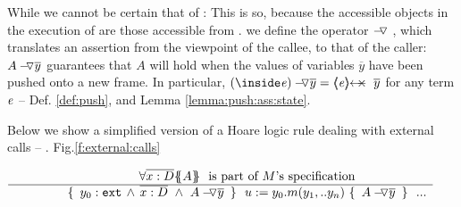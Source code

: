  {While we cannot be certain that   of : 
This is so, because the   accessible objects in the execution of  are those accessible from .
 we define the operator $\pushSymbolAA$ , which   translates an assertion from the viewpoint of the callee, to that of the caller:
 $\PushAS y A$   guarantees that $A$ will hold when the values of variables $\overline y$ have been pushed onto a new frame. 
 In particular,   $\PushAS y {(\inside \re)} =  \protectedFrom \re {\overline {y} }$ for any term  $\re$ -- \cf 
 Def. \ref{def:push},  and Lemma \ref{lemma:push:ass:state}.
}

 {Below we show a simplified version of a Hoare logic rule %
dealing with external calls -- \cf. Fig.\ref{f:external:calls} }
 
 $\inferruleNoName  
 	{ 
   	   {\TwoStatesN {\overline {x:D}} {A}}\ \   \mbox{is part of $M$'s specification}
        }
	{   \triple { \    { \external{y_0}} \,     \wedge \,  \overline{x:D}\  \wedge\  {\PushAS {y}{A}}\ }  
						{ \ u:=y_0.m(y_1,.. y_n)\    }
						{ \    {\PushAS {y}{A}}  \ }
						\  \  ...
         }
$


